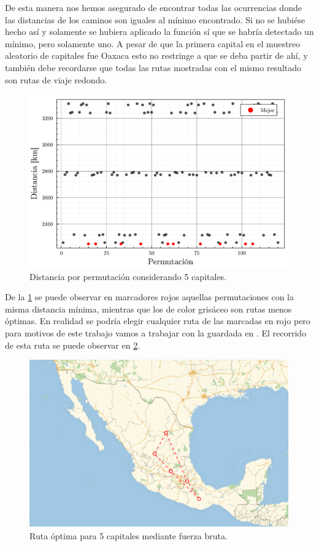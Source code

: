 De esta manera nos hemos asegurado de encontrar todas las ocurrencias donde las distancias de los caminos son iguales al mínimo encontrado. Si no se hubiése hecho así y solamente se hubiera aplicado la función  sí que se habría detectado un mínimo, pero solamente uno. A pesar de que la primera capital en el muestreo aleatorio de capitales fue Oaxaca esto no restringe a que se deba partir de ahí, y también debe recordarse que todas las rutas mostradas con el mismo resultado son rutas de viaje redondo.
\begin{figure}[ht!]
    \centering
    \includegraphics[scale=0.5]{../figures/distances_cities_05_bruteforce.pdf}
    \caption{Distancia por permutación considerando 5 capitales.}
    \label{fig:bruteforce_distances_cities_05}
\end{figure}

De la \cref{fig:bruteforce_distances_cities_05} se puede observar en marcadores rojos aquellas permutaciones con la misma distancia mínima, mientras que los de color grisáceo son rutas menos óptimas. En realidad se podría elegir cualquier ruta de las marcadas en rojo pero para motivos de este trabajo vamos a trabajar con la guardada en . El recorrido de esta ruta se puede observar en \cref{fig:bruteforce_path_cities_05}.
\begin{figure}[ht]
    \centering
    \includegraphics[scale=0.8]{../figures/trip_cities_05_bruteforce.pdf}
    \caption{Ruta óptima para 5 capitales mediante fuerza bruta.}
    \label{fig:bruteforce_path_cities_05}
\end{figure}

